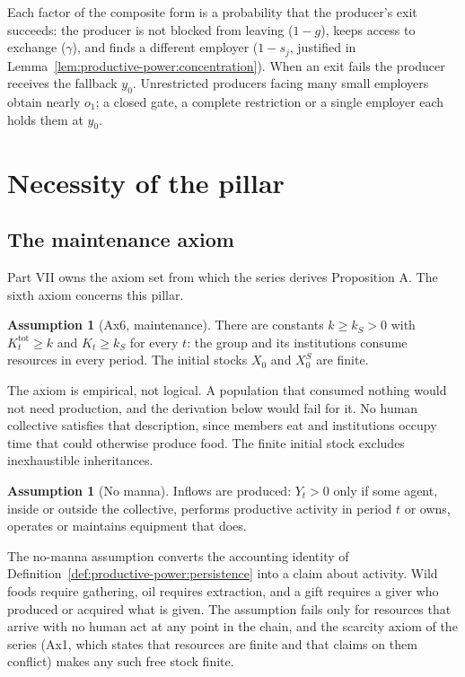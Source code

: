 \documentclass[11pt,letterpaper]{article}
\theoremstyle{definition}
\newtheorem{assumption}[theorem]{Assumption}
\theoremstyle{remark}
\begin{document}
Each factor of the composite form is a probability that the producer's exit succeeds: the producer is not blocked from leaving ($1-g$), keeps access to exchange ($\gamma$), and finds a different employer ($1-s_j$, justified in Lemma~\ref{lem:productive-power:concentration}). When an exit fails the producer receives the fallback $y_0$. Unrestricted producers facing many small employers obtain nearly $o_1$; a closed gate, a complete restriction or a single employer each holds them at $y_0$.

\section{Necessity of the pillar}
\label{sec:necessity}

\subsection{The maintenance axiom}

Part VII owns the axiom set from which the series derives Proposition A. The sixth axiom concerns this pillar.

\begin{assumption}[Ax6, maintenance]
\label{ass:productive-power:ax6}
There are constants $k\ge k_S>0$ with $K^{\mathrm{tot}}_t\ge k$ and $K_t\ge k_S$ for every $t$: the group and its institutions consume resources in every period. The initial stocks $X_0$ and $X^S_0$ are finite.
\end{assumption}

The axiom is empirical, not logical. A population that consumed nothing would not need production, and the derivation below would fail for it. No human collective satisfies that description, since members eat and institutions occupy time that could otherwise produce food. The finite initial stock excludes inexhaustible inheritances.

\begin{assumption}[No manna]
\label{ass:productive-power:nomanna}
Inflows are produced: $Y_t>0$ only if some agent, inside or outside the collective, performs productive activity in period $t$ or owns, operates or maintains equipment that does.
\end{assumption}

The no-manna assumption converts the accounting identity of Definition~\ref{def:productive-power:persistence} into a claim about activity. Wild foods require gathering, oil requires extraction, and a gift requires a giver who produced or acquired what is given. The assumption fails only for resources that arrive with no human act at any point in the chain, and the scarcity axiom of the series (Ax1, which states that resources are finite and that claims on them conflict) makes any such free stock finite.
\end{document}
